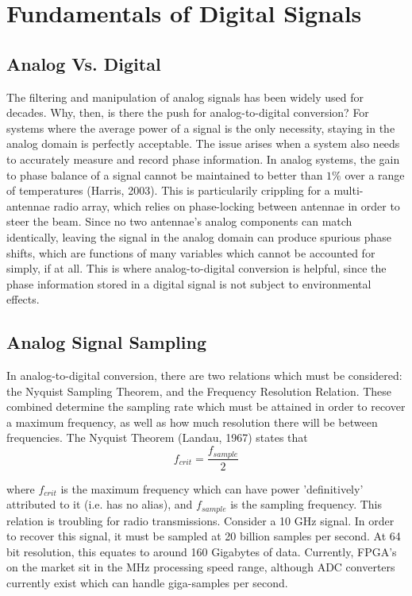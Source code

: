 \documentclass{report}
\begin{document}
\chapter{Fundamentals of Digital Signals}
\section{Analog Vs. Digital}

The filtering and manipulation of analog signals has been widely used for decades.  Why, then, is there the push for analog-to-digital conversion?  For systems where the average power of a signal is the only necessity, staying in the analog domain is perfectly acceptable.  The issue arises when a system also needs to accurately measure and record phase information.  In analog systems, the gain to phase balance of a signal cannot be maintained to better than $1\%$ over a range of temperatures (Harris, 2003).  This is particularily crippling for a multi-antennae radio array, which relies on phase-locking between antennae in order to steer the beam.  Since no two antennae's analog components can match identically, leaving the signal in the analog domain can produce spurious phase shifts, which are functions of many variables which cannot be accounted for simply, if at all.  This is where analog-to-digital conversion is helpful, since the phase information stored in a digital signal is not subject to environmental effects.  

\section{Analog Signal Sampling}

In analog-to-digital conversion, there are two relations which must be considered: the Nyquist Sampling Theorem, and the Frequency Resolution Relation.  These combined determine the sampling rate which must be attained in order to recover a maximum frequency, as well as how much resolution there will be between frequencies.  The Nyquist Theorem (Landau, 1967) states that
\begin{equation}
f_{crit} = \frac{f_{sample}}{2}
\end{equation}

where $f_{crit}$ is the maximum frequency which can have power 'definitively' attributed to it (i.e. has no alias), and $f_{sample}$ is the sampling frequency.  This relation is troubling for radio transmissions.  Consider a 10 GHz signal.  In order to recover this signal, it must be sampled at 20 billion samples per second.  At 64 bit resolution, this equates to around 160 Gigabytes of data.  Currently, FPGA's on the market sit in the MHz processing speed range, although ADC converters currently exist which can handle giga-samples per second.
\end{document}
